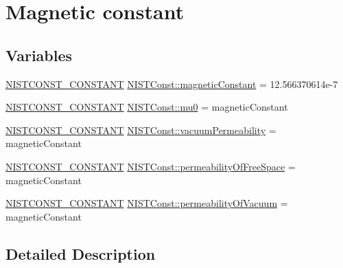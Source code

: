 \hypertarget{group___n_i_s_t_const-_magnetic_constant}{}\section{Magnetic constant}
\label{group___n_i_s_t_const-_magnetic_constant}
\subsection*{Variables}
\begin{DoxyCompactItemize}
\item 
\mbox{\hyperlink{group___n_i_s_t_const-_macros_ga2b0fc1d7452373f816175dd86ce26729}{N\+I\+S\+T\+C\+O\+N\+S\+T\+\_\+\+C\+O\+N\+S\+T\+A\+NT}} \mbox{\hyperlink{group___n_i_s_t_const-_magnetic_constant_gae78bada05f4e3438f6197ca595d9d09b}{N\+I\+S\+T\+Const\+::magnetic\+Constant}} = 12.\+566370614e-\/7
\item 
\mbox{\hyperlink{group___n_i_s_t_const-_macros_ga2b0fc1d7452373f816175dd86ce26729}{N\+I\+S\+T\+C\+O\+N\+S\+T\+\_\+\+C\+O\+N\+S\+T\+A\+NT}} \mbox{\hyperlink{group___n_i_s_t_const-_magnetic_constant_gac57c9dd11cfdf9721e21096a00d6e5d8}{N\+I\+S\+T\+Const\+::mu0}} = magnetic\+Constant
\item 
\mbox{\hyperlink{group___n_i_s_t_const-_macros_ga2b0fc1d7452373f816175dd86ce26729}{N\+I\+S\+T\+C\+O\+N\+S\+T\+\_\+\+C\+O\+N\+S\+T\+A\+NT}} \mbox{\hyperlink{group___n_i_s_t_const-_magnetic_constant_ga25744097d980a807738dbea653616d78}{N\+I\+S\+T\+Const\+::vacuum\+Permeability}} = magnetic\+Constant
\item 
\mbox{\hyperlink{group___n_i_s_t_const-_macros_ga2b0fc1d7452373f816175dd86ce26729}{N\+I\+S\+T\+C\+O\+N\+S\+T\+\_\+\+C\+O\+N\+S\+T\+A\+NT}} \mbox{\hyperlink{group___n_i_s_t_const-_magnetic_constant_ga4ce4f543f7f71f5df049935291a3e59b}{N\+I\+S\+T\+Const\+::permeability\+Of\+Free\+Space}} = magnetic\+Constant
\item 
\mbox{\hyperlink{group___n_i_s_t_const-_macros_ga2b0fc1d7452373f816175dd86ce26729}{N\+I\+S\+T\+C\+O\+N\+S\+T\+\_\+\+C\+O\+N\+S\+T\+A\+NT}} \mbox{\hyperlink{group___n_i_s_t_const-_magnetic_constant_gaac945c334102b3ce3ee774ea18051a42}{N\+I\+S\+T\+Const\+::permeability\+Of\+Vacuum}} = magnetic\+Constant
\end{DoxyCompactItemize}


\subsection{Detailed Description}


